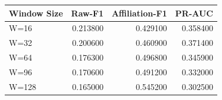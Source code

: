 \begin{tabular}{lrrr}
\toprule
Window Size & Raw-F1 & Affiliation-F1 & PR-AUC \\
\midrule
W=16 & 0.213800 & 0.429100 & 0.358400 \\
W=32 & 0.200600 & 0.460900 & 0.371400 \\
W=64 & 0.176300 & 0.496800 & 0.345900 \\
W=96 & 0.170600 & 0.491200 & 0.332000 \\
W=128 & 0.165000 & 0.545200 & 0.302500 \\
\bottomrule
\end{tabular}
